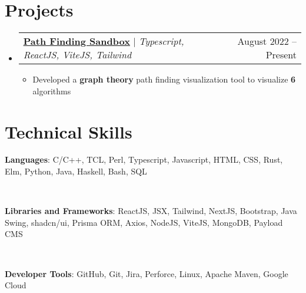 \documentclass[letterpaper,11pt]{article}
\makeatletter
\newcommand{\resumeItem}[1]{
  \item\small{
    {#1 \vspace{-2pt}}
  }
}
\newcommand{\resumeProjectHeading}[2]{
    \vspace{-2pt}\item
    \begin{tabular*}{0.97\textwidth}{l@{\extracolsep{\fill}}r}
        #1 & #2 \\
    \end{tabular*}\vspace{-7pt}
}
\newcommand{\resumeListItem}[1]{
    \vspace{-2pt}\item#1
}
\newcommand{\resumeSubHeadingListStart}{\begin{itemize}[leftmargin=0.15in, label={}]}
\newcommand{\resumeSubHeadingListEnd}{\end{itemize}}
\newcommand{\resumeListStart}{\begin{itemize}[itemindent=-0.33in,leftmargin=0.48in, label={}]}
\newcommand{\resumeListEnd}{\end{itemize}}
\newcommand{\resumeItemListStart}{\begin{itemize}}
\newcommand{\resumeItemListEnd}{\end{itemize}\vspace{-5pt}}
\makeatother
\begin{document}
\section{Projects}
\resumeSubHeadingListStart
\resumeProjectHeading
{\href{https://github.com/fvcci/Path-Finder-Sandbox}{\textbf{\underline{Path Finding Sandbox}}} $|$ \emph{Typescript, ReactJS, ViteJS, Tailwind}}{August 2022 -- Present}
\resumeItemListStart
\resumeItem{Developed a \textbf{graph theory} path finding visualization tool to visualize \textbf{6} algorithms}
\resumeItemListEnd


\resumeSubHeadingListEnd


%
\section{Technical Skills}
\resumeListStart\small{
	\resumeListItem{\textbf{Languages}:
		C/C++, TCL, Perl, Typescript, Javascript, HTML, CSS, Rust, Elm, Python, Java, Haskell, Bash, SQL
	} \\
	\resumeListItem{\textbf{Libraries and Frameworks}:
		ReactJS, JSX, Tailwind, NextJS, Bootstrap, Java Swing, shadcn/ui, Prisma ORM, Axios, NodeJS, ViteJS, MongoDB, Payload CMS
	} \\
	\resumeListItem{\textbf{Developer Tools}:
		GitHub, Git, Jira, Perforce, Linux, Apache Maven, Google Cloud
	} \\
} \resumeListEnd
\end{document}
